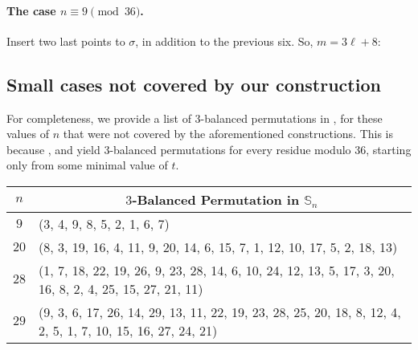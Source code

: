 \documentclass{article}
\newcommand{\threeb}{$3$-balanced\xspace}
\newcommand{\eqdef}{\vcentcolon=}
\theoremstyle{remark}
\theoremstyle{plain}
\begin{document}
\begin{appendices}
\paragraph{The case $n \equiv 9 \pmod {36}$.} Insert two last points to $\sigma$, in addition to the previous six. So, $m=3\ell+8$:

\addstackgap[7pt]{\begin{tabular}{p{1.5cm} p{5.5cm} p{5.5cm}}
& $(x_7,y_7) \eqdef (-1 + \varepsilon,\ 3t - 2 + \varepsilon)$ & $(x_8,y_8) \eqdef (4t + 1 + \varepsilon,\ t - 1 + \varepsilon)$
\end{tabular}}

\subsection{Small cases not covered by our construction}

For completeness, we provide a list of $3$-balanced permutations in , for these values of $n$ that were not covered by the aforementioned constructions. This is because ,  and  yield \threeb permutations for every residue modulo $36$, starting only from some minimal value of $t$. 

\begin{table}[H]
    \centering
    \small
    \setlength{\tabcolsep}{10pt}
    \renewcommand{\arraystretch}{1.1}
    \begin{tabular}{ ||c p{14.3cm}|| } \hline
    \multicolumn{1}{||c}{\textbf{$n$}} & \multicolumn{1}{c||}{\textbf{$3$-Balanced Permutation in $\mathbb{S}_n$}}  \\
    \hline \hline

    $9$ & (3, 4, 9, 8, 5, 2, 1, 6, 7)  \\
    
    \hline
    
    $20$ & (8, 3, 19, 16, 4, 11, 9, 20, 14, 6, 15, 7, 1, 12, 10, 17, 5, 2, 18, 13)  \\
    
    \hline
    
    $28$ & (1, 7, 18, 22, 19, 26, 9, 23, 28, 14, 6, 10, 24, 12, 13, 5, 17, 3, 20, 16, 8, 2, 4, 25, 15, 27, 21, 11)  \\

    \hline

    $29$ & (9, 3, 6, 17, 26, 14, 29, 13, 11, 22, 19, 23, 28, 25, 20, 18, 8, 12, 4, 2, 5, 1, 7, 10, 15, 16, 27, 24, 21) \\
    

\end{tabular}
\end{table}
\end{appendices}
\end{document}
